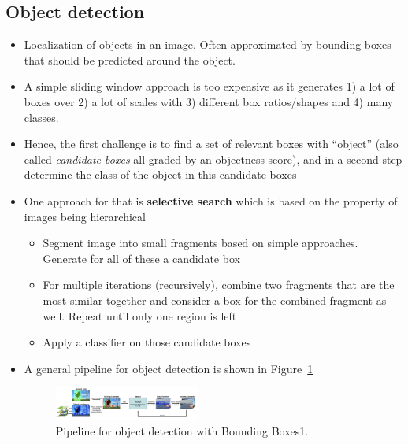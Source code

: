 \subsection{Object detection}
\begin{itemize}
	\item Localization of objects in an image. Often approximated by bounding boxes that should be predicted around the object.
	\item A simple sliding window approach is too expensive as it generates 1) a lot of boxes over 2) a lot of scales with 3) different box ratios/shapes and 4) many classes.
	\item Hence, the first challenge is to find a set of relevant boxes with ``object'' (also called \textit{candidate boxes} all graded by an objectness score), and in a second step determine the class of the object in this candidate boxes
	\item One approach for that is \textbf{selective search} which is based on the property of images being hierarchical
	\begin{itemize}
		\item Segment image into small fragments based on simple approaches. Generate for all of these a candidate box
		\item For multiple iterations (recursively), combine two fragments that are the most similar together and consider a box for the combined fragment as well. Repeat until only one region is left
		\item Apply a classifier on those candidate boxes
	\end{itemize}
	\item A general pipeline for object detection is shown in Figure~\ref{fig:cv_object_detection_BB_pipeline}
	\begin{figure}[ht!]
		\centering
		\includegraphics[width=0.45\textwidth]{figures/cv_object_detection_BB_pipeline.png}
		\caption{Pipeline for object detection with Bounding Boxes1.}
		\label{fig:cv_object_detection_BB_pipeline}
	\end{figure}
\end{itemize}